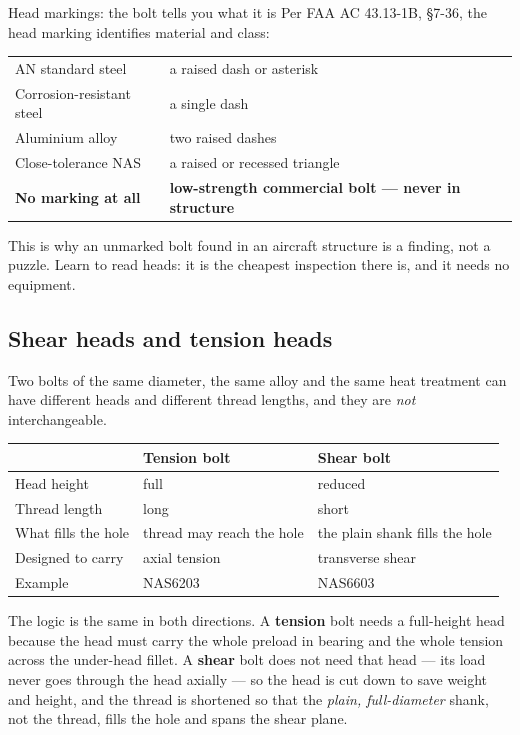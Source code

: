 \documentclass[11pt,a4paper]{article}
\begin{document}
\begin{aerobox}{Head markings: the bolt tells you what it is}
Per FAA AC 43.13-1B, \S7-36, the head marking identifies material and class:

\medskip
\begin{tabular}{@{}ll@{}}
AN standard steel & a raised dash or asterisk\\
Corrosion-resistant steel & a single dash\\
Aluminium alloy & two raised dashes\\
Close-tolerance NAS & a raised or recessed triangle\\
\textbf{No marking at all} & \textbf{low-strength commercial bolt --- never in structure}\\
\end{tabular}

\medskip
This is why an unmarked bolt found in an aircraft structure is a finding, not a puzzle. Learn to
read heads: it is the cheapest inspection there is, and it needs no equipment.
\end{aerobox}

\subsection{Shear heads and tension heads}

Two bolts of the same diameter, the same alloy and the same heat treatment can have different
heads and different thread lengths, and they are \emph{not} interchangeable.

\begin{center}\small
\begin{tabular}{@{}lll@{}}
\toprule
 & Tension bolt & Shear bolt\\
\midrule
Head height & full & reduced\\
Thread length & long & short\\
What fills the hole & thread may reach the hole & the plain shank fills the hole\\
Designed to carry & axial tension & transverse shear\\
Example & NAS6203 & NAS6603\\
\bottomrule
\end{tabular}
\end{center}

\medskip
The logic is the same in both directions. A \textbf{tension} bolt needs a full-height head because
the head must carry the whole preload in bearing and the whole tension across the under-head
fillet. A \textbf{shear} bolt does not need that head --- its load never goes through the head
axially --- so the head is cut down to save weight and height, and the thread is shortened so that
the \emph{plain, full-diameter} shank, not the thread, fills the hole and spans the shear plane.
\end{document}
